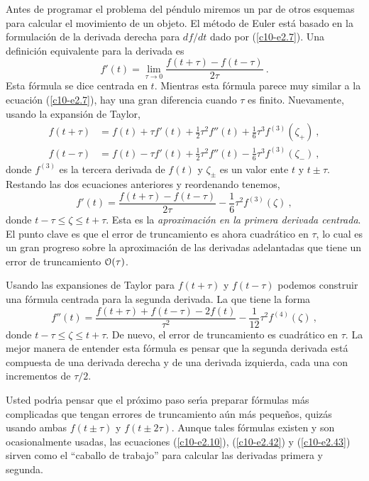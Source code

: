Antes de programar el problema del p{\'e}ndulo miremos un par de otros
esquemas para calcular el movimiento de un objeto. El m{\'e}todo de Euler
est{\'a} basado en la formulaci{\'o}n de la derivada derecha para $df/dt$ dado
por (\ref{c10-e2.7}). Una definici{\'o}n equivalente para la derivada es 
\begin{equation}
\label{c10-e2.39}
f'(t)=\lim_{\tau\to0} \frac{f(t+\tau)-f(t-\tau)}{2\tau}\ .
\end{equation}
Esta f{\'o}rmula se dice centrada en $t$. Mientras esta f{\'o}rmula parece muy
similar a la ecuaci{\'o}n (\ref{c10-e2.7}), hay una gran diferencia cuando
$\tau$ es finito. Nuevamente, usando la expansi{\'o}n de Taylor,
\begin{align}
\label{c10-e2.40}
f(t+\tau)&=f(t)+\tau f'(t)+\frac 12 \tau^2 f''(t)+\frac 16 \tau^3 f^{(3)}(\zeta_+)\ ,\\
\label{c10-e2.41}
f(t-\tau)&=f(t)-\tau f'(t)+\frac 12 \tau^2 f''(t)-\frac 16 \tau^3 f^{(3)}(\zeta_-)\ ,
\end{align}
donde $f^{(3)}$ es la tercera derivada de $f(t)$ y $\zeta_{\pm}$ es un
valor ente $t$ y $t \pm\tau$. Restando las dos ecuaciones anteriores y
reordenando tenemos,
\begin{equation}
\label{c10-e2.42}
f'(t)=\frac{f(t+\tau)-f(t-\tau)}{2\tau}-\frac 16 \tau^2 f^{(3)}(\zeta)\ ,
\end{equation}
donde $t-\tau\leq \zeta\leq t+\tau$. Esta es la {\em aproximaci{\'o}n en la primera
  derivada centrada}. El punto clave es que el error de truncamiento
es ahora cuadr{\'a}tico en $\tau$, lo cual es un gran progreso sobre la
aproximaci{\'o}n de las derivadas adelantadas que tiene un error de
truncamiento $\EuScript{O}(\tau)$.

Usando las expansiones de Taylor para $f(t+\tau)$ y $f(t-\tau)$ podemos
construir una f{\'o}rmula centrada para la segunda derivada. La que tiene
la forma
\begin{equation}
\label{c10-e2.43}
f''(t)=\frac{f(t+\tau)+f(t-\tau)-2f(t)}{\tau^2}- \frac 1{12}\tau^2 f^{(4)}(\zeta)\ ,
\end{equation}
donde $t-\tau\leq\zeta\leq t+\tau$. De nuevo, el error de truncamiento es cuadr{\'a}tico
en $\tau$. La mejor manera de entender esta f{\'o}rmula es pensar que la
segunda derivada est{\'a} compuesta de una derivada derecha y de una
derivada izquierda, cada una con incrementos de $\tau/2$.

Usted podr{\'\i}a pensar que el pr{\'o}ximo paso ser{\'\i}a preparar f{\'o}rmulas m{\'a}s
complicadas que tengan errores de truncamiento a{\'u}n m{\'a}s peque{\~n}os,
quiz{\'a}s usando ambas $f(t\pm\tau)$ y $f(t\pm 2\tau)$. Aunque tales f{\'o}rmulas
existen y son ocasionalmente usadas, las ecuaciones (\ref{c10-e2.10}),
(\ref{c10-e2.42}) y (\ref{c10-e2.43}) sirven como el ``caballo de
trabajo'' para calcular las derivadas primera y segunda.

